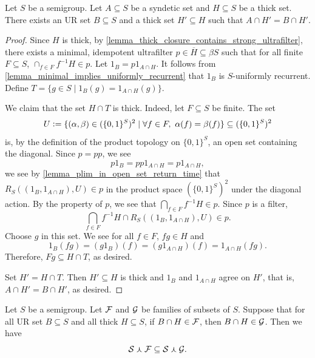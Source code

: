 \begin{lemma}
\label{lem:auslander-ellis}
\leanok{}
Let $S$ be a semigroup.  Let $A \subseteq S$ be a syndetic set and $H \subseteq S$ be a thick set. There exists an UR set $B \subseteq S$ and a thick set $H' \subseteq H$ such that $A \cap H' = B \cap H'$.
\end{lemma}

\begin{proof}
    Since $H$ is thick, by \cref{lemma_thick_closure_contains_strong_ultrafilter}, there exists a minimal, idempotent ultrafilter $p \in \overline{H} \subseteq \beta S$ such that for all finite $F \subseteq S$, $\cap_{f \in F} f^{-1} H \in p$. Let $1_B = p 1_{A \cap H}$.  It follows from \cref{lemma_minimal_implies_uniformly_recurrent} that $1_B$ is $S$-uniformly recurrent.
    Define $T = \{g \in S \mid 1_B(g) = 1_{A \cap H}(g) \}$.
    
    We claim that the set $H \cap T$ is thick.  Indeed, let $F \subseteq S$ be finite. The set
    \[U \vcentcolon= \{(\alpha, \beta) \in (\{0,1\}^S)^2 \mid \forall f \in F, \ \alpha(f) = \beta (f)\} \subseteq (\{0,1\}^S)^2\]
    is, by the definition of the product topology on $\{0,1\}^S$, an open set containing the diagonal.  Since $p = pp$, we see
    \[p 1_B = p p 1_{A \cap H} = p 1_{A \cap H},\]
    we see by \cref{lemma_plim_in_open_set_return_time} that $R_S((1_B,1_{A \cap H}), U) \in p$ in the product space $(\{0,1\}^S)^2$ under the diagonal action.  By the property of $p$, we see that $\bigcap_{f \in F} f^{-1} H \in p$.  Since $p$ is a filter,
    \[\bigcap_{f \in F} f^{-1} H \cap R_S((1_B,1_{A \cap H}), U) \in p.\]
    Choose $g$ in this set.  We see for all $f \in F$, $fg \in H$ and
    \[1_B(fg) = (g1_B)(f) = (g1_{A \cap H})(f) = 1_{A \cap H}(fg).\]
    Therefore, $Fg \subseteq H \cap T$, as desired.
    
    Set $H' = H \cap T$.  Then $H' \subseteq H$ is thick and $1_B$ and $1_{A \cap H}$ agree on $H'$, that is, $A \cap H' = B \cap H'$, as desired.
\end{proof}

\begin{theorem}
\label{thm_lspwf_upgrade}
    Let $S$ be a semigroup. Let $\mathcal{F}$ and $\mathcal{G}$ be families of subsets of $S$. Suppose that for all UR set $B \subseteq S$ and all thick $H \subseteq S$, if $B \cap H \in \mathcal{F}$, then $B \cap H \in \mathcal{G}$.  Then we have
    \[\mathcal{S} \curlywedge \mathcal{F} \subseteq \mathcal{S} \curlywedge \mathcal{G}.\]
\end{theorem}

